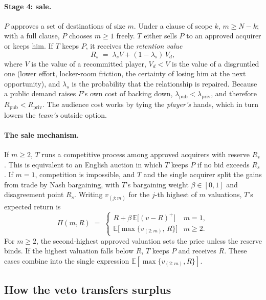 \paragraph{Stage 4: sale.} $P$ approves a set of destinations of size $m$. Under a clause of scope $k$, $m\ge N-k$; with a full clause, $P$ chooses $m\ge 1$ freely. $T$ either sells $P$ to an approved acquirer or keeps him. If $T$ keeps $P$, it receives the \emph{retention value}
\begin{equation}\label{eq:R}
R_s \;=\; \lambda_s V + (1-\lambda_s)\,V_d,
\end{equation}
where $V$ is the value of a recommitted player, $V_d<V$ is the value of a disgruntled one (lower effort, locker-room friction, the certainty of losing him at the next opportunity), and $\lambda_s$ is the probability that the relationship is repaired. Because a public demand raises $P$'s own cost of backing down, $\lambda_{\text{pub}}<\lambda_{\text{priv}}$, and therefore $R_{\text{pub}}<R_{\text{priv}}$. The audience cost works by tying the \emph{player's} hands, which in turn lowers the \emph{team's} outside option.

\paragraph{The sale mechanism.} If $m\ge2$, $T$ runs a competitive process among approved acquirers with reserve $R_s$. This is equivalent to an English auction in which $T$ keeps $P$ if no bid exceeds $R_s$. If $m=1$, competition is impossible, and $T$ and the single acquirer split the gains from trade by Nash bargaining, with $T$'s bargaining weight $\beta\in[0,1]$ and disagreement point $R_s$. Writing $v_{(j:m)}$ for the $j$-th highest of $m$ valuations, $T$'s expected return is
\begin{equation}\label{eq:Pi}
\Pi(m,R) \;=\;
\begin{cases}
R + \beta\,\mathbb{E}\big[(v-R)^+\big] & m=1,\\[3pt]
\mathbb{E}\big[\max\{v_{(2:m)},\,R\}\big] & m\ge2.
\end{cases}
\end{equation}
For $m\ge2$, the second-highest approved valuation sets the price unless the reserve binds. If the highest valuation falls below $R$, $T$ keeps $P$ and receives $R$. These cases combine into the single expression $\mathbb{E}[\max\{v_{(2:m)},R\}]$.

\subsection{How the veto transfers surplus}

